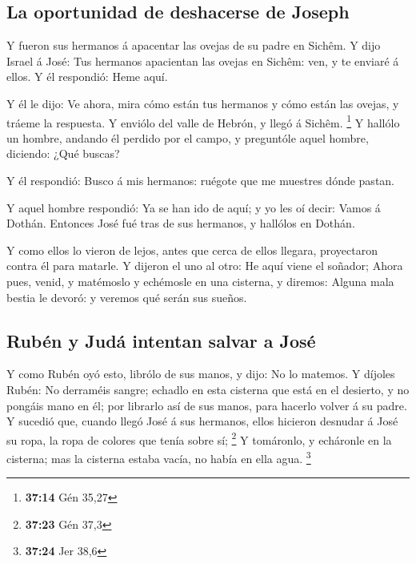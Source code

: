 \hypertarget{la-oportunidad-de-deshacerse-de-joseph}{%
\subsection{La oportunidad de deshacerse de
Joseph}\label{la-oportunidad-de-deshacerse-de-joseph}}

 Y fueron sus hermanos á apacentar las ovejas de su padre
en Sichêm.  Y dijo Israel á José: Tus hermanos apacientan
las ovejas en Sichêm: ven, y te enviaré á ellos. Y él respondió: Heme
aquí.

 Y él le dijo: Ve ahora, mira cómo están tus hermanos y
cómo están las ovejas, y tráeme la respuesta. Y enviólo del valle de
Hebrón, y llegó á Sichêm. \footnote{\textbf{37:14} Gén 35,27}
 Y hallólo un hombre, andando él perdido por el campo, y
preguntóle aquel hombre, diciendo: ¿Qué buscas?

 Y él respondió: Busco á mis hermanos: ruégote que me
muestres dónde pastan.

 Y aquel hombre respondió: Ya se han ido de aquí; y yo
les oí decir: Vamos á Dothán. Entonces José fué tras de sus hermanos, y
hallólos en Dothán.

 Y como ellos lo vieron de lejos, antes que cerca de
ellos llegara, proyectaron contra él para matarle.  Y
dijeron el uno al otro: He aquí viene el soñador;  Ahora
pues, venid, y matémoslo y echémosle en una cisterna, y diremos: Alguna
mala bestia le devoró: y veremos qué serán sus sueños.

\hypertarget{rubuxe9n-y-juduxe1-intentan-salvar-a-josuxe9}{%
\subsection{Rubén y Judá intentan salvar a
José}\label{rubuxe9n-y-juduxe1-intentan-salvar-a-josuxe9}}

 Y como Rubén oyó esto, librólo de sus manos, y dijo: No
lo matemos.  Y díjoles Rubén: No derraméis sangre;
echadlo en esta cisterna que está en el desierto, y no pongáis mano en
él; por librarlo así de sus manos, para hacerlo volver á su padre.
 Y sucedió que, cuando llegó José á sus hermanos, ellos
hicieron desnudar á José su ropa, la ropa de colores que tenía sobre sí;
\footnote{\textbf{37:23} Gén 37,3}  Y tomáronlo, y
echáronle en la cisterna; mas la cisterna estaba vacía, no había en ella
agua. \footnote{\textbf{37:24} Jer 38,6}

